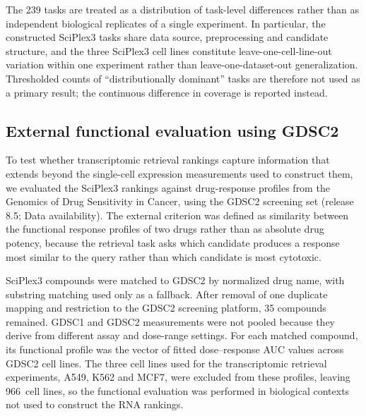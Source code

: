 \documentclass[11pt,letterpaper]{article}
\newcommand{\CTXLINES}{966}
\begin{document}
The 239 tasks are treated as a distribution of task-level differences rather than as independent
biological replicates of a single experiment. In particular, the constructed SciPlex3 tasks share
data source, preprocessing and candidate structure, and the three SciPlex3 cell lines constitute
leave-one-cell-line-out variation within one experiment rather than leave-one-dataset-out
generalization. Thresholded counts of ``distributionally dominant'' tasks are therefore not used as
a primary result; the continuous difference in coverage is reported instead.


\subsection*{External functional evaluation using GDSC2}

To test whether transcriptomic retrieval rankings capture information that extends beyond the
single-cell expression measurements used to construct them, we evaluated the SciPlex3 rankings
against drug-response profiles from the Genomics of Drug Sensitivity in Cancer\cite{GDSC,GDSCLandscape},
using the GDSC2 screening set (release 8.5; Data availability).
The external criterion was defined as similarity between the functional response profiles of two
drugs rather than as absolute drug potency, because the retrieval task asks which candidate produces
a response most similar to the query rather than which candidate is most cytotoxic.

SciPlex3 compounds were matched to GDSC2 by normalized drug name, with substring matching used
only as a fallback. After removal of one duplicate mapping and restriction to the GDSC2 screening
platform, 35 compounds remained. GDSC1 and GDSC2 measurements were not pooled because they derive
from different assay and dose-range settings. For each matched compound, its functional profile was
the vector of fitted dose--response AUC values across GDSC2 cell lines. The three cell lines used for
the transcriptomic retrieval experiments, A549, K562 and MCF7, were excluded from these profiles,
leaving \CTXLINES\ cell lines,
so the functional evaluation was performed in biological contexts not used to construct the RNA
rankings.
\end{document}
